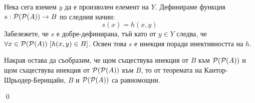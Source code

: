 \quad
Нека сега вземем $y$ да е произволен елемент на $Y$. Дефинираме функция $s: \mathcal{P}(\mathcal{P}(A)) \to B$ по следния начин:
\[
s(x) = h(x, y)
\]
\quad
Забележете, че $s$ е добре-дефинирана, тъй като от $y \in Y$ следва, че $\forall x \in \mathcal{P}(\mathcal{P}(A))\ [h(x, y) \in B]$.
Освен това $s$ е инекция поради инективността на $h$.

\smallbreak
\quad
Накрая остава да съобразим, че щом съществува инекция от $B$ към $\mathcal{P}(\mathcal{P}(A))$ и щом съществува инекция от $\mathcal{P}(\mathcal{P}(A))$ към $B$,
то от теоремата на Кантор-Шрьодер-Бернщайн, $B$ и $\mathcal{P}(\mathcal{P}(A))$ са равномощни.

\qed
